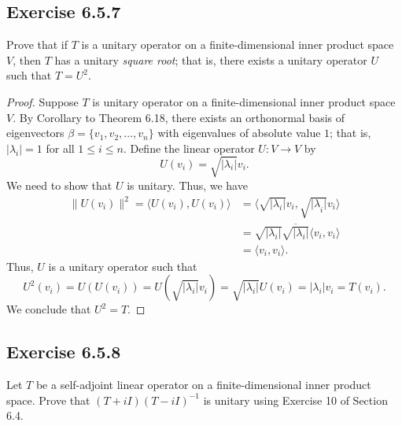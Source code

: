 \subsection*{Exercise 6.5.7} Prove that if \( T  \) is a unitary operator on a finite-dimensional inner product space \( V  \), then \( T  \) has a unitary \textit{square root}; that is, there exists a unitary operator \( U  \) such that \( T = U^{2} \).   

\begin{proof}
Suppose \( T  \) is unitary operator on a finite-dimensional inner product space \( V  \). By Corollary to Theorem 6.18, there exists an orthonormal basis of eigenvectors \( \beta = \{ {v}_{1}, {v}_{2}, \dots, {v}_{n} \}  \) with eigenvalues of absolute value \( 1  \); that is, \( | {\lambda}_{i} |  = 1  \) for all \( 1 \leq i \leq n \). Define the linear operator \( U: V \to V  \) by  
\[  U({v}_{i}) = \sqrt{| {\lambda}_{i} | }  {v}_{i}. \]
We need to show that \( U  \) is unitary. Thus, we have
\begin{align*}
    \|U({v}_{i})\|^{2} = \langle U({v}_{i}) , U({v}_{i}) \rangle &= \langle \sqrt{ |  {\lambda}_{i} |  } {v}_{i} ,  \sqrt{ { | \lambda}_{i} |  }  {v}_{i} \rangle \\
                                                                 &= \sqrt{ | {\lambda}_{i} |  }  \overline{\sqrt{ | {\lambda}_{i} |  } } \langle {v}_{i} , {v}_{i} \rangle \\
                                                                 &= \langle {v}_{i} , {v}_{i} \rangle.
\end{align*}
Thus, \( U  \) is a unitary operator such that
\[  U^{2}({v}_{i}) = U(U({v}_{i})) = U(\sqrt{ | {\lambda}_{i} |  } {v}_{i} ) = \sqrt{ | {\lambda}_{i} |  }  U({v}_{i}) = | {\lambda}_{i} | {v}_{i} = T({v}_{i}).   \] 
We conclude that \( U^{2} = T  \).
\end{proof}

\subsection*{Exercise 6.5.8} Let \( T  \) be a self-adjoint linear operator on a finite-dimensional inner product space. Prove that \( (T+iI)(T - iI)^{-1} \) is unitary using Exercise 10 of Section 6.4.

